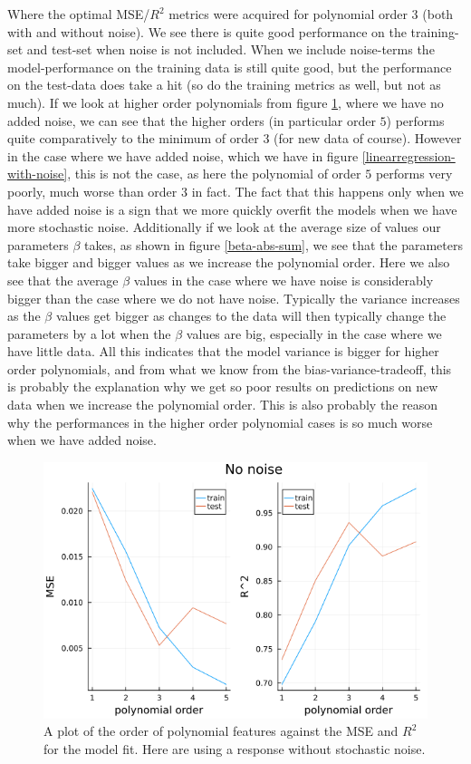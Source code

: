 \documentclass{article}
\begin{document}
Where the optimal MSE/$R^2$ metrics were acquired for polynomial order $3$ (both
with and without noise). We see there is quite good performance on the
training-set and test-set when noise is not included. When we include
noise-terms the model-performance on the training data is still quite good, but
the performance on the test-data does take a hit (so do the training metrics
as well, but not as much). If we look at higher order polynomials from figure
\ref{linearregression-no-noise}, where we have no added noise, we can see that
the higher orders (in particular order $5$) performs quite comparatively to the
minimum of order $3$ (for new data of course).  However in the case where we
have added noise, which we have in figure \ref{linearregression-with-noise},
this is not the case, as here the polynomial of order $5$ performs very poorly,
much worse than order $3$ in fact. The fact that this happens only when we have
added noise is a sign that we more quickly overfit the models when we have more
stochastic noise.  Additionally if we look at the average size of values our
parameters $\beta$ takes, as shown in figure \ref{beta-abs-sum}, we see that the
parameters take bigger and bigger values as we increase the polynomial order.
Here we also see that the average $\beta$ values in the case where we have noise
is considerably bigger than the case where we do not have noise. Typically the
variance increases as the $\beta$ values get bigger as changes to the data will
then typically change the parameters by a lot when the $\beta$ values are big,
especially in the case where we have little data. All this indicates that the
model variance is bigger for higher order polynomials, and from what we know
from the bias-variance-tradeoff, this is probably the explanation why we get so
poor results on predictions on new data when we increase the polynomial order.
This is also probably the reason why the performances in the higher order
polynomial cases is so much worse when we have added noise.

\begin{figure}
    \centerline{\includegraphics[scale=0.5]{linearregression_no_noise}}
    \caption{A plot of the order of polynomial features against the MSE and $R^2$ for the model fit. Here are using a response without stochastic noise.}
    \label{linearregression-no-noise}
\end{figure}
\end{document}
